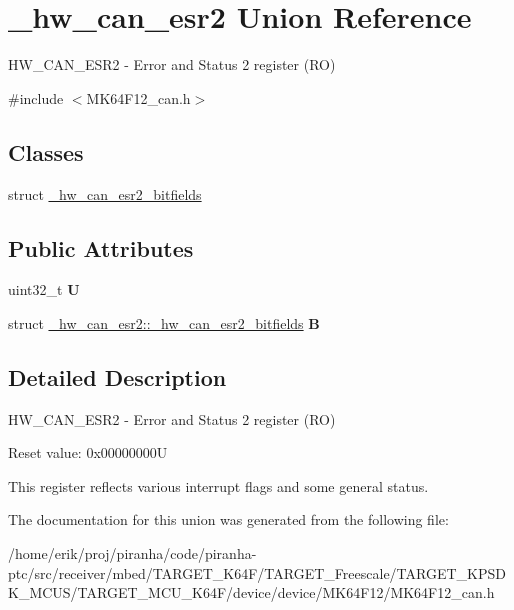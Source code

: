 \hypertarget{union__hw__can__esr2}{}\section{\+\_\+hw\+\_\+can\+\_\+esr2 Union Reference}
\label{union__hw__can__esr2}


H\+W\+\_\+\+C\+A\+N\+\_\+\+E\+S\+R2 -\/ Error and Status 2 register (RO)  




{\ttfamily \#include $<$M\+K64\+F12\+\_\+can.\+h$>$}

\subsection*{Classes}
\begin{DoxyCompactItemize}
\item 
struct \hyperlink{struct__hw__can__esr2_1_1__hw__can__esr2__bitfields}{\+\_\+hw\+\_\+can\+\_\+esr2\+\_\+bitfields}
\end{DoxyCompactItemize}
\subsection*{Public Attributes}
\begin{DoxyCompactItemize}
\item 
uint32\+\_\+t {\bfseries U}\hypertarget{union__hw__can__esr2_ad354fead1bb97405f4725955f68c3b44}{}\label{union__hw__can__esr2_ad354fead1bb97405f4725955f68c3b44}

\item 
struct \hyperlink{struct__hw__can__esr2_1_1__hw__can__esr2__bitfields}{\+\_\+hw\+\_\+can\+\_\+esr2\+::\+\_\+hw\+\_\+can\+\_\+esr2\+\_\+bitfields} {\bfseries B}\hypertarget{union__hw__can__esr2_a3ed935fec14a2fee4840e92d4337fefc}{}\label{union__hw__can__esr2_a3ed935fec14a2fee4840e92d4337fefc}

\end{DoxyCompactItemize}


\subsection{Detailed Description}
H\+W\+\_\+\+C\+A\+N\+\_\+\+E\+S\+R2 -\/ Error and Status 2 register (RO) 

Reset value\+: 0x00000000U

This register reflects various interrupt flags and some general status. 

The documentation for this union was generated from the following file\+:\begin{DoxyCompactItemize}
\item 
/home/erik/proj/piranha/code/piranha-\/ptc/src/receiver/mbed/\+T\+A\+R\+G\+E\+T\+\_\+\+K64\+F/\+T\+A\+R\+G\+E\+T\+\_\+\+Freescale/\+T\+A\+R\+G\+E\+T\+\_\+\+K\+P\+S\+D\+K\+\_\+\+M\+C\+U\+S/\+T\+A\+R\+G\+E\+T\+\_\+\+M\+C\+U\+\_\+\+K64\+F/device/device/\+M\+K64\+F12/M\+K64\+F12\+\_\+can.\+h\end{DoxyCompactItemize}
